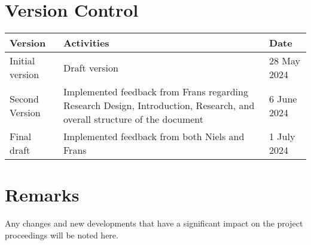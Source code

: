 
\section*{Version Control}

\begin{longtable}{|p{4cm}||p{8cm}||p{4cm}|}
  \hline
  \textbf{Version} & \textbf{Activities}                                                                                                      & \textbf{Date} \\
  \endfirsthead
  \hline
  Initial version  & Draft version                                                                                                            & 28 May 2024   \\
  \hline
  Second Version   & Implemented feedback from Frans regarding Research Design, Introduction, Research, and overall structure of the document & 6 June 2024   \\
  \hline
  Final draft      & Implemented feedback from both Niels and Frans                                                                           & 1 July 2024   \\
  \hline
\end{longtable}

\section*{Remarks}

\noindent Any changes and new developments that have a significant impact on the project proceedings will be noted here.
